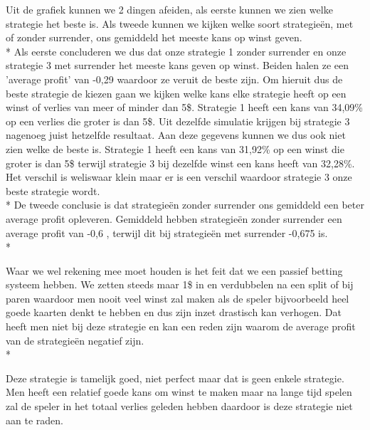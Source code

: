 \documentclass[conference]{IEEEtran}
\begin{document}
Uit de grafiek kunnen we 2 dingen afeiden, als eerste kunnen we zien welke strategie het beste is. Als tweede kunnen we kijken welke soort strategie\"en, met of zonder surrender, ons gemiddeld het meeste kans op winst geven. \\*
Als eerste concluderen we dus dat onze strategie 1 zonder surrender en onze strategie 3 met surrender het meeste kans geven op winst. Beiden halen ze een 'average profit' van -0,29 waardoor ze veruit de beste zijn. Om hieruit dus de beste strategie de kiezen gaan we kijken welke kans elke strategie heeft op een winst of verlies van meer of minder dan 5\$. Strategie 1 heeft een kans van 34,09\% op een verlies die groter is dan 5\$. Uit dezelfde simulatie krijgen bij strategie 3 nagenoeg juist hetzelfde resultaat. Aan deze gegevens kunnen we dus ook niet zien welke de beste is. Strategie 1 heeft een kans van 31,92\% op een winst die groter is dan 5\$ terwijl strategie 3 bij dezelfde winst een kans heeft van 32,28\%. Het verschil is weliswaar klein maar er is een verschil waardoor strategie 3 onze beste strategie wordt. \\*
De tweede conclusie is dat strategie\"en zonder surrender ons gemiddeld een beter average profit opleveren. Gemiddeld hebben strategie\"en zonder surrender een average profit van -0,6 , terwijl dit bij strategie\"en met surrender -0,675 is. \\*

Waar we wel rekening mee moet houden is het feit dat we een passief betting systeem hebben. We zetten steeds maar 1\$ in en verdubbelen na een split of bij paren waardoor men nooit veel winst zal maken als de speler bijvoorbeeld heel goede kaarten denkt te hebben en dus zijn inzet drastisch kan verhogen. Dat heeft men niet bij deze strategie en kan een reden zijn waarom de average profit van de strategie\"en negatief zijn.\\*

Deze strategie is tamelijk goed, niet perfect maar dat is geen enkele strategie. Men heeft een relatief goede kans om winst te maken maar na lange tijd spelen zal de speler in het totaal verlies geleden hebben daardoor is deze strategie niet aan te raden. 


\newpage

\nocite{*}
\end{document}
